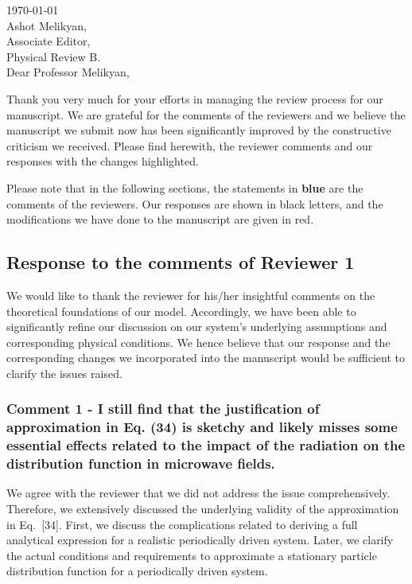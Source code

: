\documentclass{article}
\begin{document}

\today\\

Ashot Melikyan,\\
Associate Editor,\\
Physical Review B.\\

Dear Professor Melikyan,

Thank you very much for your efforts in managing the review process for our manuscript. We are grateful for the comments of the reviewers and we believe the manuscript we submit now has been significantly improved by the constructive criticism we received. Please find herewith, the reviewer comments and our responses with the changes highlighted.

Please note that in the following sections, the statements in {\color{RoyalBlue} \textbf{blue}} are the comments of the reviewers. Our responses are shown in black letters, and the modifications we have done to the manuscript are given in {\color{Red} red}.

\subsection*{Response to the comments of Reviewer 1}

We would like to thank the reviewer for his/her insightful comments on the theoretical foundations of our model. Accordingly, we have been able to significantly refine our discussion on our system's underlying assumptions and corresponding physical conditions. We hence believe that our response and the corresponding changes we incorporated into the manuscript would be sufficient to clarify the issues raised.

\subsubsection*{Comment 1 -
\color{RoyalBlue} I still find that the justification of approximation in Eq. (34) is sketchy and likely misses some essential effects related to the impact of the radiation on the distribution function in microwave fields.}

We agree with the reviewer that we did not address the issue comprehensively. Therefore, we extensively discussed the underlying validity of the approximation in Eq.~[34]. First, we discuss the complications related to deriving a full analytical expression for a realistic periodically driven system. Later, we clarify the actual conditions and requirements to approximate a stationary particle distribution function for a periodically driven system.
\end{document}
